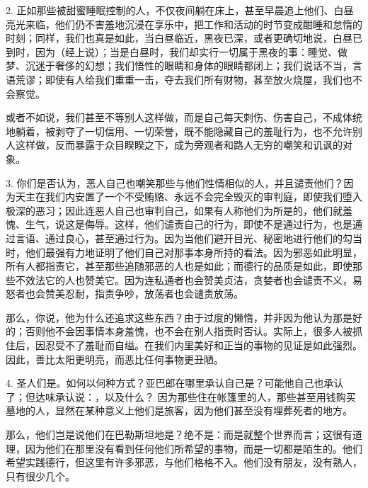 2. 正如那些被甜蜜睡眠控制的人，不仅夜间躺在床上，甚至早晨追上他们、白昼亮光来临，他们仍不害羞地沉浸在享乐中，把工作和活动的时节变成酣睡和怠惰的时刻；同样，我们也真是如此，当白昼临近，黑夜已深，或者更确切地说，白昼已到时，因为（经上说）；当是白昼时，我们却实行一切属于黑夜的事：睡觉、做梦、沉迷于奢侈的幻想；我们悟性的眼睛和身体的眼睛都闭上；我们说话不当，言语荒谬；即使有人给我们重重一击，夺去我们所有财物，甚至放火烧屋，我们也不会察觉。\par

或者不如说，我们甚至不等别人这样做，而是自己每天刺伤、伤害自己，不成体统地躺着，被剥夺了一切信用、一切荣誉，既不能隐藏自己的羞耻行为，也不允许别人这样做，反而暴露于众目睽睽之下，成为旁观者和路人无穷的嘲笑和讥讽的对象。\par

3. 你们是否认为，恶人自己也嘲笑那些与他们性情相似的人，并且谴责他们？因为天主在我们内安置了一个不受贿赂、永远不会完全毁灭的审判庭，即使我们堕入极深的恶习；因此连恶人自己也审判自己，如果有人称他们为所是的，他们就羞愧、生气，说这是侮辱。这样，他们谴责自己的行为，即使不是通过行为，也是通过言语、通过良心，甚至通过行为。因为当他们避开目光、秘密地进行他们的勾当时，他们最强有力地证明了他们自己对那事本身所持的看法。因为邪恶如此明显，所有人都指责它，甚至那些追随邪恶的人也是如此；而德行的品质是如此，即使那些不效法它的人也赞美它。因为连私通者也会赞美贞洁，贪婪者也会谴责不义，易怒者也会赞美忍耐，指责争吵，放荡者也会谴责放荡。\par

那么，你说，他为什么还追求这些东西？由于过度的懒惰，并非因为他认为那是好的；否则他不会因事情本身羞愧，也不会在别人指责时否认。实际上，很多人被抓住后，因忍受不了羞耻而自缢。在我们内里美好和正当的事物的见证是如此强烈。因此，善比太阳更明亮，而恶比任何事物更丑陋。\par

4. 圣人们是。如何以何种方式？亚巴郎在哪里承认自己是？可能他自己也承认了；但达味承认说：，以及什么？ 因为那些住在帐篷里的人，那些甚至用钱购买墓地的人，显然在某种意义上他们是旅客，因为他们甚至没有埋葬死者的地方。\par

那么，他们岂是说他们在巴勒斯坦地是？绝不是：而是就整个世界而言；这很有道理，因为他们在那里没有看到任何他们所希望的事物，而是一切都是陌生的。他们希望实践德行，但这里有许多邪恶，与他们格格不入。他们没有朋友，没有熟人，只有很少几个。\par

